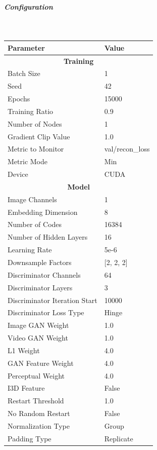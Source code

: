 \subparagraph{Configuration}\mbox{}\\

\begin{table}[H]
\centering
\begin{tabular}{|l|l|}
\hline
\textbf{Parameter} & \textbf{Value} \\
\hline
\multicolumn{2}{|c|}{\textbf{Training}} \\
\hline
Batch Size & 1 \\
\hline
Seed & 42 \\
\hline
Epochs & 15000 \\
\hline
Training Ratio & 0.9 \\
\hline
Number of Nodes & 1 \\
\hline
Gradient Clip Value & 1.0 \\
\hline
Metric to Monitor & val/recon\_loss \\
\hline
Metric Mode & Min \\
\hline
Device & CUDA \\
\hline
\multicolumn{2}{|c|}{\textbf{Model}} \\
\hline
Image Channels & 1 \\
\hline
Embedding Dimension & 8 \\
\hline
Number of Codes & 16384 \\
\hline
Number of Hidden Layers & 16 \\
\hline
Learning Rate & 5e-6 \\
\hline
Downsample Factors & [2, 2, 2] \\
\hline
Discriminator Channels & 64 \\
\hline
Discriminator Layers & 3 \\
\hline
Discriminator Iteration Start & 10000 \\
\hline
Discriminator Loss Type & Hinge \\
\hline
Image GAN Weight & 1.0 \\
\hline
Video GAN Weight & 1.0 \\
\hline
L1 Weight & 4.0 \\
\hline
GAN Feature Weight & 4.0 \\
\hline
Perceptual Weight & 4.0 \\
\hline
I3D Feature & False \\
\hline
Restart Threshold & 1.0 \\
\hline
No Random Restart & False \\
\hline
Normalization Type & Group \\
\hline
Padding Type & Replicate \\

\end{tabular}
\end{table}
